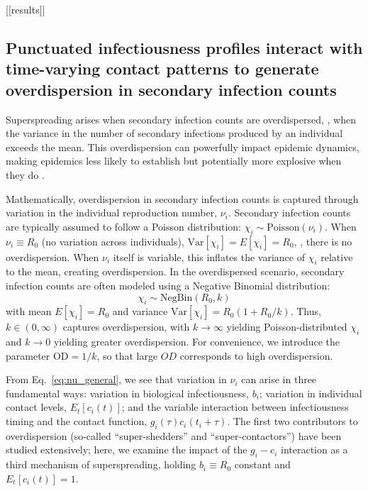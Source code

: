 [[results]]

\subsection{Punctuated infectiousness profiles interact with time-varying contact patterns to generate overdispersion in secondary infection counts}

Superspreading arises when secondary infection counts are overdispersed, \ie,  when the variance in the number of secondary infections produced by an individual exceeds the mean. This overdispersion can powerfully impact epidemic dynamics, making epidemics less likely to establish but potentially more explosive when they do \citep{lloyd-smith_superspreading_2005}. 

Mathematically, overdispersion in secondary infection counts is captured through variation in the individual reproduction number, $\nu_i$. Secondary infection counts are typically assumed to follow a Poisson distribution: $\chi_i \sim \text{Poisson}(\nu_i)$. When $\nu_i \equiv R_0$ (no variation across individuals), $\text{Var}[\chi_i] = E[\chi_i] = R_0$, \ie, there is no overdispersion. When $\nu_i$ itself is variable, this inflates the variance of $\chi_i$ relative to the mean, creating overdispersion. In the overdispersed scenario, secondary infection counts are often modeled using a Negative Binomial distribution: 
\begin{equation}
	\chi_i \sim \text{NegBin}(R_0, k)
\end{equation}
with mean $E[\chi_i] = R_0$ and variance $\text{Var}[\chi_i] = R_0 (1 + R_0 / k)$. Thus, $k \in (0, \infty)$ captures overdispersion, with $k \rightarrow \infty$ yielding Poisson-distributed $\chi_i$ and $k \rightarrow 0$ yielding greater overdispersion. For convenience, we introduce the parameter $\text{OD} = 1/k$, so that large $OD$ corresponds to high overdispersion. 

From Eq.~\ref{eq:nu_general}, we see that variation in $\nu_i$ can arise in three fundamental ways: variation in biological infectiousness, $b_i$; variation in individual contact levels, $E_t[c_i(t)]$; and the variable interaction between infectiousness timing and the contact function, $g_i(\tau) c_i(t_i+\tau)$. The first two contributors to overdispersion (so-called ``super-shedders'' and ``super-contactors'') have been studied extensively; here, we examine the impact of the $g_i - c_i$ interaction as a third mechanism of superspreading, holding $b_i \equiv R_0$ constant and $E_t[c_i(t)] = 1$. 

